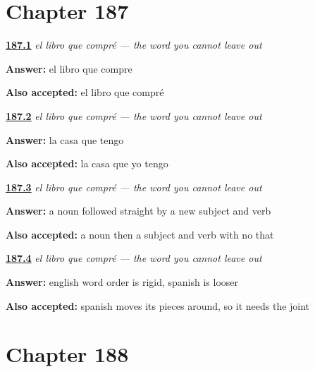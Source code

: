 \section*{Chapter 187}

\noindent\begin{minipage}[t]{\linewidth}
\raggedright
\hyperlink{review-ES-C53-que-no-se-cae-book}{\textbf{187.1}} \emph{el libro que compré — the word you cannot leave out}\par
\small \textbf{Answer:} el libro que compre\par
\footnotesize \textbf{Also accepted:} el libro que compré
\end{minipage}\par\medskip

\noindent\begin{minipage}[t]{\linewidth}
\raggedright
\hyperlink{review-ES-C53-que-no-se-cae-house}{\textbf{187.2}} \emph{el libro que compré — the word you cannot leave out}\par
\small \textbf{Answer:} la casa que tengo\par
\footnotesize \textbf{Also accepted:} la casa que yo tengo
\end{minipage}\par\medskip

\noindent\begin{minipage}[t]{\linewidth}
\raggedright
\hyperlink{review-ES-C53-que-no-se-cae-habit}{\textbf{187.3}} \emph{el libro que compré — the word you cannot leave out}\par
\small \textbf{Answer:} a noun followed straight by a new subject and verb\par
\footnotesize \textbf{Also accepted:} a noun then a subject and verb with no that
\end{minipage}\par\medskip

\noindent\begin{minipage}[t]{\linewidth}
\raggedright
\hyperlink{review-ES-C53-que-no-se-cae-why}{\textbf{187.4}} \emph{el libro que compré — the word you cannot leave out}\par
\small \textbf{Answer:} english word order is rigid, spanish is looser\par
\footnotesize \textbf{Also accepted:} spanish moves its pieces around, so it needs the joint
\end{minipage}\par\medskip

\section*{Chapter 188}

